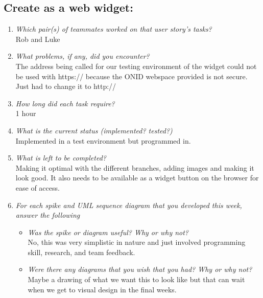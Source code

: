 \documentclass[12pt, letterpaper]{article}
\begin{document}
   \subsection{Create as a web widget:}
   \begin{enumerate}
   	\item \emph{Which pair(s) of teammates worked on that user story's tasks?}
   	\\Rob and Luke
   	\item \emph{What problems, if any, did you encounter?}
   	\\The address being called for our testing environment of the widget could not be used with https:// because the ONID webspace provided is not secure. Just had to change it to http://
   	\item \emph{How long did each task require?}
   	\\1 hour
   	\item \emph{What is the current status (implemented? tested?)}
   	\\Implemented in a test environment but programmed in.
   	\item \emph{What is left to be completed?}
   	\\Making it optimal with the different branches, adding images and making it look good. It also needs to be available as a widget button on the browser for ease of access.
   	\item \emph{For each spike and UML sequence diagram that you developed this week, answer the following}
   	\begin{itemize}
   		\item \emph{Was the spike or diagram useful? Why or why not?}
   		\\No, this was very simplistic in nature and just involved programming skill, research, and team feedback.
   		\item \emph{Were there any diagrams that you wish that you had? Why or why not?}
   		\\Maybe a drawing of what we want this to look like but that can wait when we get to visual design in the final weeks.
   	\end{itemize}
   \end{enumerate}
\end{document}
